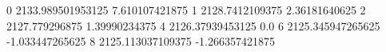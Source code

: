 0 2133.989501953125 7.610107421875
1 2128.7412109375 2.36181640625
2 2127.779296875 1.39990234375
4 2126.37939453125 0.0
6 2125.345947265625 -1.033447265625
8 2125.113037109375 -1.266357421875
